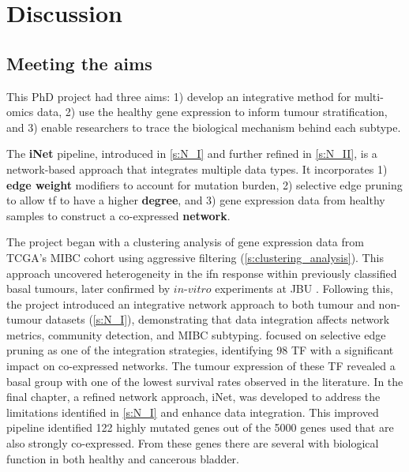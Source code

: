 \chapter{Discussion} \label{s:discussion}

\vspace{3mm}
\vspace{3mm}


\section{Meeting the aims}

This PhD project had three aims: 1) develop an integrative method for multi-omics data, 2) use the healthy gene expression to inform tumour stratification, and 3) enable researchers to trace the biological mechanism behind each subtype.

The \textbf{iNet} pipeline, introduced in \cref{s:N_I} and further refined in \cref{s:N_II}, is a network-based approach that integrates multiple data types. It incorporates 1) \textbf{edge weight} modifiers to account for mutation burden, 2) selective edge pruning to allow \acrlong{tf} to have a higher \textbf{degree}, and 3) gene expression data from healthy samples to construct a co-expressed \textbf{network}.


The project began with a clustering analysis of gene expression data from TCGA's MIBC cohort using aggressive filtering (\cref{s:clustering_analysis}). This approach uncovered heterogeneity in the \acrlong{ifn} response within previously classified basal tumours, later confirmed by $in$-$vitro$ experiments at JBU \citep{Baker2022-bj}. Following this, the project introduced an integrative network approach to both tumour and non-tumour datasets (\cref{s:N_I}), demonstrating that data integration affects network metrics, community detection, and MIBC subtyping.  focused on selective edge pruning as one of the integration strategies, identifying 98 TF with a significant impact on co-expressed networks. The tumour expression of these TF revealed a basal group with one of the lowest survival rates observed in the literature. In the final chapter, a refined network approach, iNet, was developed to address the limitations identified in \cref{s:N_I} and enhance data integration. This improved pipeline identified 122 highly mutated genes out of the 5000 genes used that are also strongly co-expressed. From these genes there are several with biological function in both healthy  and cancerous bladder.

